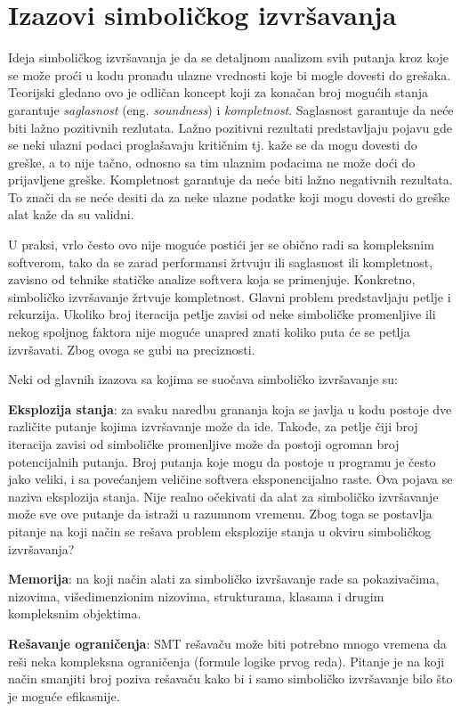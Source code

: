\documentclass[12pt,oneside]{memoir}
\begin{document}
\section{Izazovi simboličkog izvršavanja}

Ideja simboličkog izvršavanja je da se detaljnom analizom svih putanja kroz koje se može proći u kodu pronađu ulazne vrednosti koje bi mogle dovesti do grešaka. Teorijski gledano ovo je odličan koncept koji za konačan broj mogućih stanja garantuje \textit{saglasnost} (eng. \textit{soundness}) i \textit{kompletnost}. Saglasnost garantuje da neće biti lažno pozitivnih rezlutata. Lažno pozitivni rezultati predstavljaju pojavu gde se neki ulazni podaci proglašavaju kritičnim tj. kaže se da mogu dovesti do greške, a to nije tačno, odnosno sa tim ulaznim podacima ne može doći do prijavljene greške. Kompletnost garantuje da neće biti lažno negativnih rezultata. To znači da se neće desiti da za neke ulazne podatke koji mogu dovesti do greške alat kaže da su validni. 

U praksi, vrlo često ovo nije moguće postići jer se obično radi sa kompleksnim softverom, tako da se zarad performansi žrtvuju ili saglasnost ili kompletnost, zavisno od tehnike statičke analize softvera koja se primenjuje. Konkretno, simboličko izvršavanje žrtvuje kompletnost. Glavni problem predstavljaju petlje i rekurzija. Ukoliko broj iteracija petlje zavisi od neke simboličke promenljive ili nekog spoljnog faktora nije moguće unapred znati koliko puta će se petlja izvršavati. Zbog ovoga se gubi na preciznosti. 

Neki od glavnih izazova sa kojima se suočava simboličko izvršavanje su: 

\begin{description}
    \item \textbf{Eksplozija stanja}: za svaku naredbu grananja koja se javlja u kodu postoje dve različite putanje kojima izvršavanje može da ide. Takođe, za petlje čiji broj iteracija zavisi od simboličke promenljive može da postoji ogroman broj potencijalnih putanja. Broj putanja koje mogu da postoje u programu je često jako veliki, i sa povećanjem veličine softvera eksponencijalno raste. Ova pojava se naziva eksplozija stanja. Nije realno očekivati da alat za simboličko izvršavanje može sve ove putanje da istraži u razumnom vremenu. Zbog toga se postavlja pitanje na koji način se rešava problem eksplozije stanja u okviru simboličkog izvršavanja?
    
    \item \textbf{Memorija}: na koji način alati za simboličko izvršavanje rade sa pokazivačima, nizovima, višedimenzionim nizovima, strukturama, klasama i drugim kompleksnim objektima.

    \item \textbf{Rešavanje ograničenja}: SMT rešavaču može biti potrebno mnogo vremena da reši neka kompleksna ograničenja (formule logike prvog reda). Pitanje je na koji način smanjiti broj poziva rešavaču kako bi i samo simboličko izvršavanje bilo što je moguće efikasnije.
    
\end{description}
\end{document}

